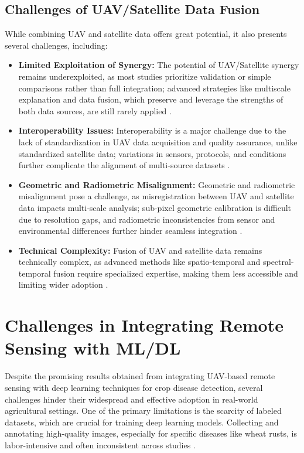 \subsection{Challenges of UAV/Satellite Data Fusion}
While combining UAV and satellite data offers great potential, it also presents several challenges, including:

\begin{itemize}
    \item \textbf{Limited Exploitation of Synergy:} The potential of UAV/Satellite synergy remains underexploited, as most studies prioritize validation or simple comparisons rather than full integration; advanced strategies like multiscale explanation and data fusion, which preserve and leverage the strengths of both data sources, are still rarely applied \parencite{AlvarezVanhard2021}.
  
    \item \textbf{Interoperability Issues:} Interoperability is a major challenge due to the lack of standardization in UAV data acquisition and quality assurance, unlike standardized satellite data; variations in sensors, protocols, and conditions further complicate the alignment of multi-source datasets \parencite{AlvarezVanhard2021}.
  
    \item \textbf{Geometric and Radiometric Misalignment:} Geometric and radiometric misalignment pose a challenge, as misregistration between UAV and satellite data impacts multi-scale analysis; sub-pixel geometric calibration is difficult due to resolution gaps, and radiometric inconsistencies from sensor and environmental differences further hinder seamless integration \parencite{AlvarezVanhard2021}.
  
    \item \textbf{Technical Complexity:} Fusion of UAV and satellite data remains technically complex, as advanced methods like spatio-temporal and spectral-temporal fusion require specialized expertise, making them less accessible and limiting wider adoption \parencite{AlvarezVanhard2021}.
  \end{itemize}
  

\section{Challenges in Integrating Remote Sensing with ML/DL}
Despite the promising results obtained from integrating UAV-based remote sensing with deep learning techniques for crop disease detection, several challenges hinder their widespread and effective adoption in real-world agricultural settings. One of the primary limitations is the scarcity of labeled datasets, which are crucial for training deep learning models. Collecting and annotating high-quality images, especially for specific diseases like wheat rusts, is labor-intensive and often inconsistent across studies \parencite{shahi2023recent}.


